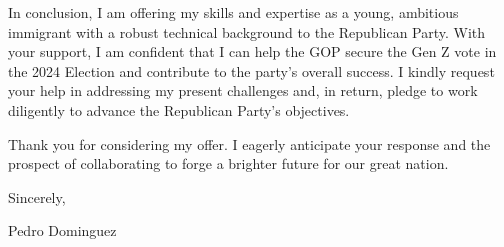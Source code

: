 \documentclass[12pt]{article}
\begin{document}
In conclusion, I am offering my skills and expertise as a young, ambitious immigrant with a robust technical background to the Republican Party. With your support, I am confident that I can help the GOP secure the Gen Z vote in the 2024 Election and contribute to the party’s overall success. I kindly request your help in addressing my present challenges and, in return, pledge to work diligently to advance the Republican Party’s objectives.

Thank you for considering my offer. I eagerly anticipate your response and the prospect of collaborating to forge a brighter future for our great nation.

Sincerely,

Pedro Dominguez
\end{document}
